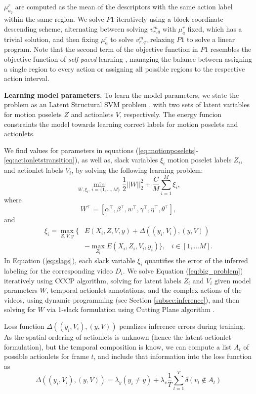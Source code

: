 $\mu_{a_q}^r$ are computed as the mean of the descriptors with the same action 
label within the same region. We solve $P1$ iteratively using a block coordinate 
descending scheme, alternating between solving $v_{r,q}^m$ with $\mu_{a}^r$ 
fixed, which has a trivial solution, and then fixing $\mu_{a}^r$ to solve 
$v_{r,q}^m$, relaxing $P1$ to solve a linear program. Note that the second term 
of the objective function in $P1$ resembles the objective function of 
\emph{self-paced} learning \cite{Kumar:EtAl:2010}, managing the balance between 
assigning a single region to every action or assigning all possible regions to 
the respective action interval.  

\textbf{Learning model parameters.}
To learn the model parameters, we state the problem as an Latent Structural SVM 
problem \cite{Yu:Joachims:2010}, with two sets of latent variables for motion 
poselets $Z$ and actionlets $V$, respectively. The energy funcion constraints 
the model towards learning correct labels for motion poselets and 
actionlets. 

We find values for parameters in equations 
(\ref{eq:motionposelets}-\ref{eq:actionletstransition}), as well as,
slack variables $\xi_i$ motion poselet labels $Z_i$, and actionlet labels $V_i$, 
by solving the following learning problem:
{\small
\begin{equation}
\label{eq:big_problem}
\min_{W,\xi_i,~i=\{1,\dots,M\}}    \frac{1}{2}||W||_2^2 + \frac{C}{M} \sum_{i=1}^M\xi_i ,
\end{equation}}
where
{\small \begin{equation}
W^\top=[\alpha^\top, \beta^\top, w^\top, \gamma^\top, \eta^\top, \theta^\top],
\end{equation}}
and
{\small
\begin{equation} \label{eq:slags}
\begin{split}
\xi_i = \max_{Z,V,y}  \{  & E(X_i, Z, V, y) + \Delta( (y_i,V_i), (y, V)) \\
 & - \max_{Z_i}{ E(X_i, Z_i, V_i, y_i)} \}, \; \;\; i\in[1,...M].	
\end{split}
\end{equation}}
In Equation (\ref{eq:slags}), each slack variable
$\xi_i$ quantifies the error of the inferred labeling for the corresponding 
video $D_i$. We solve Equation (\ref{eq:big_problem}) iteratively using CCCP 
algorithm, solving for latent labels $Z_i$ and $V_i$ given model parameters $W$, 
temporal actionlet annotations, and the complex actions of the videos, using 
dynamic programming (see Section \ref{subsec:inference}), and then solving for 
$W$ via 1-slack formulation using Cutting Plane algorithm 
\cite{Joachims2009}. 

Loss function $\Delta((y_i,V_i),(y,V))$ penalizes inference errors during 
training. As the spatial ordering of actionlets is unknown (hence the latent 
actionlet formulation), but the temporal composition is know, we can compute a 
list $A_t$ of possible actionlets for frame $t$, and include  that information 
into the loss function as
{\small \begin{equation}
\Delta((y_i,V_i),(y,V)) = \lambda_y(y_i \ne y) + \lambda_v\frac{1}{T}\sum_{t=1}^T 
\delta(v_t \notin A_t)
\end{equation}}


